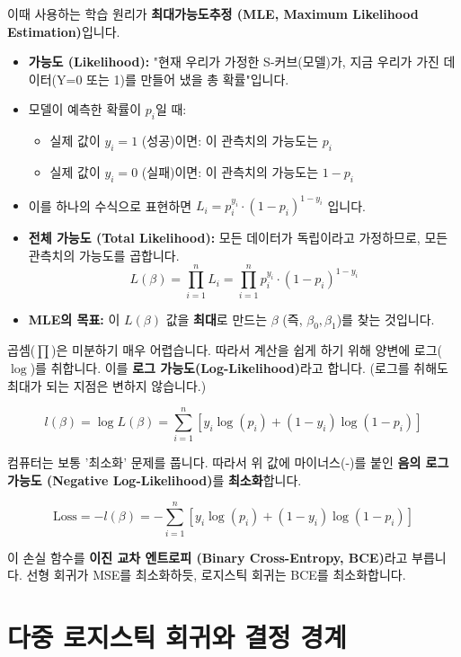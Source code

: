 \documentclass[11pt,a4paper]{book}
\theoremstyle{definition}
\begin{document}
이때 사용하는 학습 원리가 \textbf{최대가능도추정 (MLE, Maximum Likelihood Estimation)}입니다.

\begin{itemize}
    \item \textbf{가능도 (Likelihood):} "현재 우리가 가정한 S-커브(모델)가, 지금 우리가 가진 데이터(Y=0 또는 1)를 만들어 냈을 총 확률"입니다.
    \item 모델이 예측한 확률이 $p_i$일 때:
    \begin{itemize}
        \item 실제 값이 $y_i = 1$ (성공)이면: 이 관측치의 가능도는 $p_i$
        \item 실제 값이 $y_i = 0$ (실패)이면: 이 관측치의 가능도는 $1 - p_i$
    \end{itemize}
    \item 이를 하나의 수식으로 표현하면 $L_i = p_i^{y_i} \cdot (1-p_i)^{1-y_i}$ 입니다.
    \item \textbf{전체 가능도 (Total Likelihood):} 모든 데이터가 독립이라고 가정하므로, 모든 관측치의 가능도를 곱합니다.
    $$ L(\beta) = \prod_{i=1}^n L_i = \prod_{i=1}^n p_i^{y_i} \cdot (1-p_i)^{1-y_i} $$
    \item \textbf{MLE의 목표:} 이 $L(\beta)$ 값을 \textbf{최대}로 만드는 $\beta$ (즉, $\beta_0, \beta_1$)를 찾는 것입니다.
\end{itemize}

\begin{warningbox}[title=손실 함수: 이진 교차 엔트로피 (BCE)]
곱셈($\prod$)은 미분하기 매우 어렵습니다. 따라서 계산을 쉽게 하기 위해 양변에 로그($\log$)를 취합니다. 이를 \textbf{로그 가능도(Log-Likelihood)}라고 합니다. (로그를 취해도 최대가 되는 지점은 변하지 않습니다.)

$$ l(\beta) = \log L(\beta) = \sum_{i=1}^n \left[ y_i \log(p_i) + (1-y_i) \log(1-p_i) \right] $$

컴퓨터는 보통 '최소화' 문제를 풉니다. 따라서 위 값에 마이너스(-)를 붙인 \textbf{음의 로그 가능도 (Negative Log-Likelihood)}를 \textbf{최소화}합니다.

$$ \text{Loss} = -l(\beta) = -\sum_{i=1}^n \left[ y_i \log(p_i) + (1-y_i) \log(1-p_i) \right] $$

이 손실 함수를 \textbf{이진 교차 엔트로피 (Binary Cross-Entropy, BCE)}라고 부릅니다. 선형 회귀가 MSE를 최소화하듯, 로지스틱 회귀는 BCE를 최소화합니다.
\end{warningbox}


\section{다중 로지스틱 회귀와 결정 경계}
\end{document}
